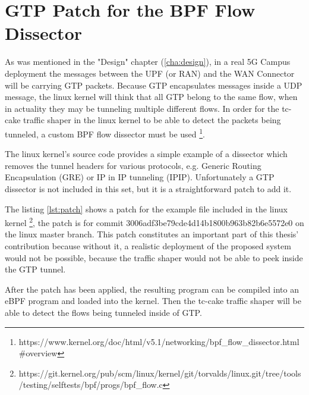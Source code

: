 

\cleardoublepage
\chapter{GTP Patch for the BPF Flow Dissector}
\label{appendix:patch}

As was mentioned in the "Design" chapter (\ref{cha:design}), in a real 5G Campus deployment the messages between the UPF (or RAN) and the WAN Connector will be carrying GTP packets. Because GTP encapsulates messages inside a UDP message, the linux kernel will think that all GTP belong to the same flow, when in actuality they may be tunneling multiple different flows. In order for the tc-cake traffic shaper in the linux kernel to be able to detect the packets being tunneled, a custom BPF flow dissector must be used \footnote{https://www.kernel.org/doc/html/v5.1/networking/bpf\_flow\_dissector.html\#overview}.

The linux kernel's source code provides a simple example of a dissector which removes the tunnel headers for various protocols, e.g. Generic Routing Encapsulation (GRE) or IP in IP tunneling (IPIP). Unfortunately a GTP dissector is not included in this set, but it is a straightforward patch to add it.

The listing \ref{lst:patch} shows a patch for the example file included in the linux kernel \footnote{https://git.kernel.org/pub/scm/linux/kernel/git/torvalds/linux.git/tree/tools/testing/selftests/bpf/progs/bpf\_flow.c}, the patch is for commit 3006adf3be79cde4d14b1800b963b82b6e5572e0 on the linux master branch. This patch constitutes an important part of this thesis' contribution because without it, a realistic deployment of the proposed system would not be possible, because the traffic shaper would not be able to peek inside the GTP tunnel.

After the patch has been applied, the resulting program can be compiled into an eBPF program and loaded into the kernel. Then the tc-cake traffic shaper will be able to detect the flows being tunneled inside of GTP.

\clearpage

